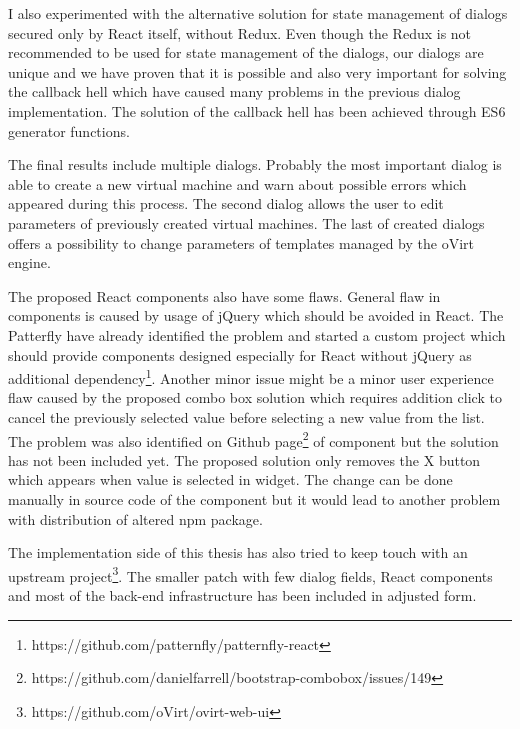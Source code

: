I also experimented with the alternative solution for state management of dialogs secured only by React itself, without Redux. Even though the Redux is not recommended to be used for state management of the dialogs, our dialogs are unique and we have proven that it is possible and also very important for solving the callback hell which have caused many problems in the previous dialog implementation. The solution of the callback hell has been achieved through ES6 generator functions.

The final results include multiple dialogs. Probably the most important dialog is able to create a new virtual machine and warn about possible errors which appeared during this process. The second dialog allows the user to edit parameters of previously created virtual machines. The last of created dialogs offers a possibility to change parameters of templates managed by the oVirt engine.

The proposed React components also have some flaws. General flaw in components is caused by usage of jQuery which should be avoided in React. The Patterfly have already identified the problem and started a custom project which should provide components designed especially for React without jQuery as additional dependency\footnote{https://github.com/patternfly/patternfly-react}. Another minor issue might be a minor user experience flaw caused by the proposed combo box solution which requires addition click to cancel the previously selected value before selecting a new value from the list. The problem was also identified on Github page\footnote{https://github.com/danielfarrell/bootstrap-combobox/issues/149 } of component but the solution has not been included yet. The proposed solution only removes the X button which appears when value is selected in widget. The change can be done manually in source code of the component but it would lead to another problem with distribution of altered npm package.

The implementation side of this thesis has also tried to keep touch with an upstream project\footnote{https://github.com/oVirt/ovirt-web-ui}. The smaller patch with few dialog fields, React components and most of the back-end infrastructure has been included in adjusted form.


 
